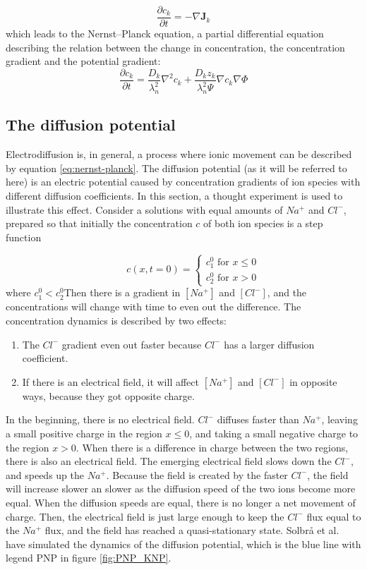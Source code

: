 \documentclass{article}
\begin{document}
\begin{equation}\label{eq:continuity}
\frac{\partial c_k}{\partial t} = -\nabla \bm{J}_k
\end{equation}
which leads to the Nernst--Planck equation, a partial differential equation describing the relation between the change in concentration, the concentration gradient and the potential gradient:
 \begin{equation}\label{eq:nernst-planck}
\frac{\partial c_k}{\partial t}  = \frac{D_k}{\lambda_n^2}\nabla^2 c_k +\frac{D_k z_k}{\lambda_n^2 \Psi}\nabla c_k  \nabla \Phi
\end{equation}


\subsection{The diffusion potential}
Electrodiffusion is, in general, a process where ionic movement can be described by equation \ref{eq:nernst-planck}. The diffusion potential (as it will be referred to here) is an electric potential caused by concentration gradients of ion species with different diffusion coefficients. In this section, a thought experiment is used to illustrate this effect.
Consider a solutions with equal amounts of $Na^+$ and $Cl^-$, prepared so that initially the concentration $c$ of both ion species is a step function 

\begin{equation}
 \qquad c\left(x,t=0\right) = \begin{cases}
  c_1^0 \text{ for } x \leq 0 \\
  c_2^0 \text{ for } x>0 
  \end{cases}
  \label{eq:step_function }
\end{equation}
where $c_1^0<c_2^0$Then there is a gradient in $[Na^+]$ and $[Cl^-]$, and the concentrations will change with time to even out the difference. The concentration dynamics is described by two effects:
\begin{enumerate}
\item The $Cl^-$ gradient even out faster because $Cl^-$ has a larger diffusion coefficient. 
\item If there is an electrical field, it will affect  $[Na^+]$ and $[Cl^-]$ in opposite ways, because they got opposite charge.
\end{enumerate}
In the beginning, there is no electrical field. $Cl^-$ diffuses faster than $Na^+$, leaving a small positive charge in the region $x\leq 0$, and taking a small negative charge to the region $x>0$. When there is a difference in charge between the two regions, there is also an electrical field. The emerging electrical field slows down the $Cl^-$, and speeds up the $Na^+$. Because the field is created by the faster $Cl^-$, the field will increase slower an slower as the diffusion speed of the two ions become more equal. When the diffusion speeds are equal, there is no longer a net movement of charge. Then, the electrical field is just large enough to keep the $Cl^-$ flux equal to the $Na^+$ flux, and the field has reached a quasi-stationary state.  Solbr{\aa} et al. have simulated the dynamics of the diffusion potential, which is the blue line with legend PNP in figure \ref{fig:PNP_KNP}.  
\end{document}
